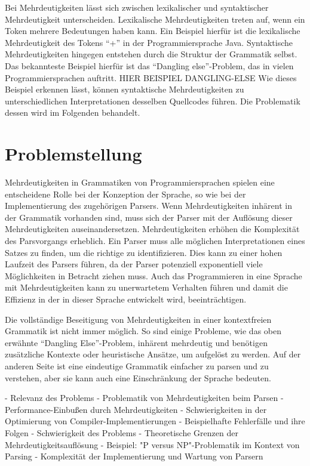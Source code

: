 \documentclass[runningheads]{llncs}
\begin{document}
Bei Mehrdeutigkeiten lässt sich zwischen lexikalischer und syntaktischer Mehrdeutigkeit unterscheiden.
Lexikalische Mehrdeutigkeiten treten auf, wenn ein Token mehrere Bedeutungen haben kann.
Ein Beispiel hierfür ist die lexikalische Mehrdeutigkeit des Tokens ``+'' in der Programmiersprache Java.
Syntaktische Mehrdeutigkeiten hingegen entstehen durch die Struktur der Grammatik selbst.
Das bekannteste Beispiel hierfür ist das ``Dangling else''-Problem, das in vielen Programmiersprachen auftritt.
HIER BEISPIEL DANGLING-ELSE
Wie dieses Beispiel erkennen lässt,
können syntaktische Mehrdeutigkeiten zu unterschiedlichen Interpretationen desselben Quellcodes führen.
Die Problematik dessen wird im Folgenden behandelt.


\section{Problemstellung}

Mehrdeutigkeiten in Grammatiken von Programmiersprachen
spielen eine entscheidene Rolle bei der Konzeption der Sprache,
so wie bei der Implementierung des zugehörigen Parsers.
Wenn Mehrdeutigkeiten inhärent in der Grammatik vorhanden sind,
muss sich der Parser mit der Auflösung dieser Mehrdeutigkeiten auseinandersetzen.
Mehrdeutigkeiten erhöhen die Komplexität des Parsvorgangs erheblich.
Ein Parser muss alle möglichen Interpretationen eines Satzes zu finden, um die richtige zu identifizieren.
Dies kann zu einer hohen Laufzeit des Parsers führen,
da der Parser potenziell exponentiell viele Möglichkeiten in Betracht ziehen muss.
Auch das Programmieren in eine Sprache mit Mehrdeutigkeiten kann zu unerwartetem Verhalten führen
und damit die Effizienz in der in dieser Sprache entwickelt wird, beeinträchtigen.

Die vollständige Beseitigung von Mehrdeutigkeiten in einer kontextfreien Grammatik ist nicht immer möglich.
So sind einige Probleme, wie das oben erwähnte ``Dangling Else''-Problem,
inhärent mehrdeutig und benötigen zusätzliche Kontexte oder heuristische Ansätze, um aufgelöst zu werden.
Auf der anderen Seite ist eine eindeutige Grammatik einfacher zu parsen und zu verstehen,
aber sie kann auch eine Einschränkung der Sprache bedeuten.

- Relevanz des Problems
- Problematik von Mehrdeutigkeiten beim Parsen
- Performance-Einbußen durch Mehrdeutigkeiten
- Schwierigkeiten in der Optimierung von Compiler-Implementierungen
- Beispielhafte Fehlerfälle und ihre Folgen
- Schwierigkeit des Problems
- Theoretische Grenzen der Mehrdeutigkeitsauflösung
- Beispiel: "P versus NP"-Problematik im Kontext von Parsing
- Komplexität der Implementierung und Wartung von Parsern
\end{document}
